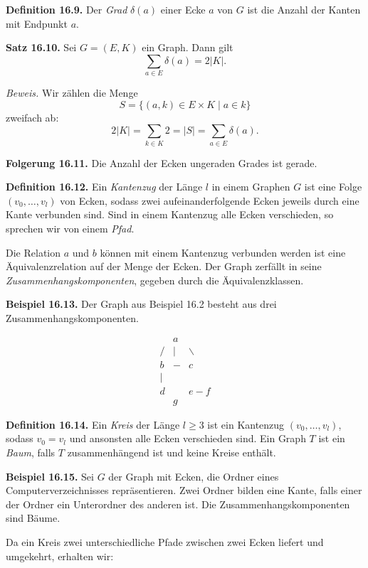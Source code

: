 \documentclass[9pt]{article}
\begin{document}
\textbf{Definition 16.9.}  
Der \textit{Grad} \( \delta(a) \) einer Ecke \( a \) von \( G \) ist die Anzahl der Kanten mit Endpunkt \( a \).

\textbf{Satz 16.10.}  
Sei \( G = (E, K) \) ein Graph. Dann gilt  
\[
\sum_{a \in E} \delta(a) = 2|K|.
\]

\textit{Beweis.}  
Wir zählen die Menge  
\[
S = \{(a, k) \in E \times K \mid a \in k\}
\]
zweifach ab:
\[
2|K| = \sum_{k \in K} 2 = |S| = \sum_{a \in E} \delta(a).
\]

\textbf{Folgerung 16.11.}  
Die Anzahl der Ecken ungeraden Grades ist gerade.

\textbf{Definition 16.12.}  
Ein \textit{Kantenzug} der Länge \( l \) in einem Graphen \( G \) ist eine Folge \( (v_0, \dots, v_l) \) von Ecken, sodass zwei aufeinanderfolgende Ecken jeweils durch eine Kante verbunden sind.  
Sind in einem Kantenzug alle Ecken verschieden, so sprechen wir von einem \textit{Pfad}.

Die Relation \glqq\( a \) und \( b \) können mit einem Kantenzug verbunden werden\grqq{} ist eine Äquivalenzrelation auf der Menge der Ecken. Der Graph zerfällt in seine \textit{Zusammenhangskomponenten}, gegeben durch die Äquivalenzklassen.

\textbf{Beispiel 16.13.}  
Der Graph aus Beispiel 16.2 besteht aus drei Zusammenhangskomponenten.

\[
\begin{array}{ccc}
  & a & \\
 / & | & \backslash \\
b  & - & c \\
 | & & \\
d & & e - f \\
  & g & 
\end{array}
\]

\textbf{Definition 16.14.}  
Ein \textit{Kreis} der Länge \( l \geq 3 \) ist ein Kantenzug \( (v_0, \dots, v_l) \), sodass \( v_0 = v_l \) und ansonsten alle Ecken verschieden sind.  
Ein Graph \( T \) ist ein \textit{Baum}, falls \( T \) zusammenhängend ist und keine Kreise enthält.

\textbf{Beispiel 16.15.}  
Sei \( G \) der Graph mit Ecken, die Ordner eines Computerverzeichnisses repräsentieren. Zwei Ordner bilden eine Kante, falls einer der Ordner ein Unterordner des anderen ist. Die Zusammenhangskomponenten sind Bäume.

Da ein Kreis zwei unterschiedliche Pfade zwischen zwei Ecken liefert und umgekehrt, erhalten wir:
\end{document}
